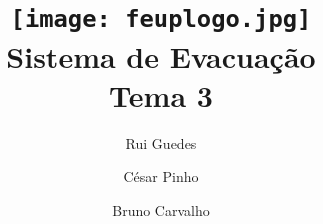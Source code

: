 \documentclass[11pt,a4paper,titlepage]{article}
\title{
    \texttt{[image: feuplogo.jpg]}\\
    \vspace{2\baselineskip}
    \Huge Sistema de Evacuação\\
    \LARGE Tema 3
}
\author{
    Rui Guedes\\ \text{up201603854@fe.up.pt}
    \and
    César Pinho\\ \text{up201604039@fe.up.pt}
    \and
    Bruno Carvalho\\ \text{up201606517@fe.up.pt}
}
\begin{document}
\maketitle
\tableofcontents
\clearpage















\medskip

\printbibliography
\end{document}

